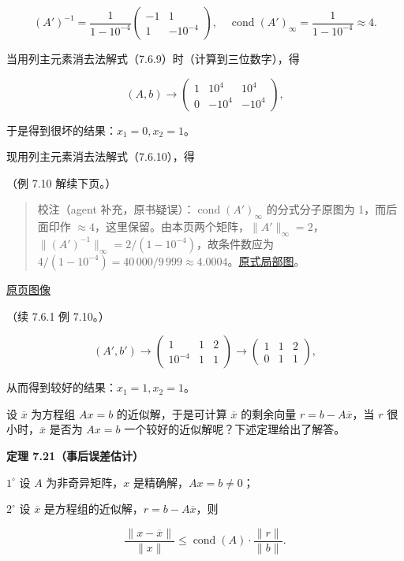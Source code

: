 \documentclass[
  10pt,
  fontset=fandol]{ctexart}
\begin{document}
\[
(A')^{-1}=\frac1{1-10^{-4}}\begin{pmatrix}-1&1\\1&-10^{-4}\end{pmatrix},\quad
\operatorname{cond}(A')_\infty=\frac1{1-10^{-4}}\approx4.
\]

当用列主元素消去法解式（7.6.9）时（计算到三位数字），得

\[
(A,b)\longrightarrow
\left(\begin{array}{cc|c}
1&10^4&10^4\\
0&-10^4&-10^4
\end{array}\right),
\]

于是得到很坏的结果：\(x_1=0,x_2=1\)。

现用列主元素消去法解式（7.6.10），得

（例 7.10 解续下页。）

\begin{quote}
校注（agent 补充，原书疑误）：\(\operatorname{cond}(A')_\infty\) 的分式分子原图为 1，而后面印作 \(\approx4\)，这里保留。由本页两个矩阵，\(\|A'\|_\infty=2\)，\(\|(A')^{-1}\|_\infty=2/(1-10^{-4})\)，故条件数应为 \(4/(1-10^{-4})=40\,000/9\,999\approx4.0004\)。\href{../assets/ch07b/209-scaled-cond.png}{原式局部图}。
\end{quote}

\href{../../source-images/pdf-210.jpeg}{原页图像}

（续 7.6.1 例 7.10。）

\[
(A',b')\longrightarrow
\left(\begin{array}{cc|c}1&1&2\\10^{-4}&1&1\end{array}\right)
\longrightarrow
\left(\begin{array}{cc|c}1&1&2\\0&1&1\end{array}\right),
\]

从而得到较好的结果：\(x_1=1,x_2=1\)。

设 \(\overline x\) 为方程组 \(Ax=b\) 的近似解，于是可计算 \(\overline x\) 的剩余向量 \(r=b-A\overline x\)，当 \(r\) 很小时，\(\overline x\) 是否为 \(Ax=b\) 一个较好的近似解呢？下述定理给出了解答。

\textbf{定理 7.21（事后误差估计）}

\(1^\circ\) 设 \(A\) 为非奇异矩阵，\(x\) 是精确解，\(Ax=b\neq0\)；

\(2^\circ\) 设 \(\overline x\) 是方程组的近似解，\(r=b-A\overline x\)，则

\[
\frac{\|x-\overline x\|}{\|x\|}\leqslant\operatorname{cond}(A)\cdot\frac{\|r\|}{\|b\|}.
\tag{7.6.11}
\]
\end{document}
